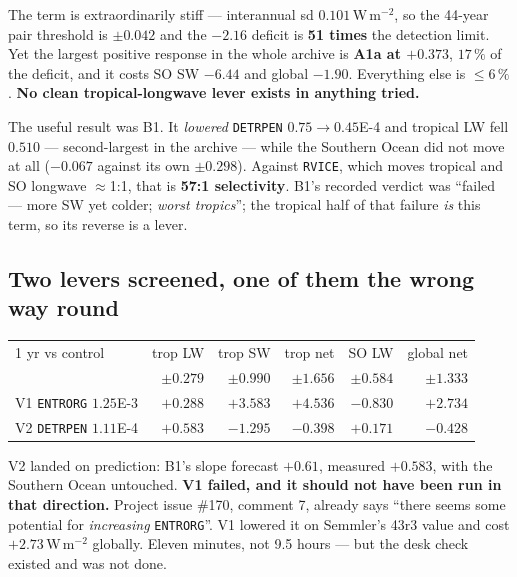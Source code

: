 \documentclass[10pt]{article}
\begin{document}
The term is extraordinarily stiff --- interannual sd $0.101$\,W\,m$^{-2}$, so the 44-year
pair threshold is $\pm0.042$ and the $-2.16$ deficit is \textbf{51 times} the detection
limit. Yet the largest positive response in the whole archive is \textbf{A1a at $+0.373$},
$17\,\%$ of the deficit, and it costs SO SW $-6.44$ and global $-1.90$. Everything else is
$\leq 6\,\%$. \textbf{No clean tropical-longwave lever exists in anything tried.}

The useful result was B1. It \emph{lowered} \texttt{DETRPEN} $0.75\to0.45$E-4 and tropical
LW fell $0.510$ --- second-largest in the archive --- while the Southern Ocean did not
move at all ($-0.067$ against its own $\pm0.298$). Against \texttt{RVICE}, which moves
tropical and SO longwave $\approx$1:1, that is \textbf{57:1 selectivity}. B1's recorded
verdict was ``failed --- more SW yet colder; \emph{worst tropics}''; the tropical half of
that failure \emph{is} this term, so its reverse is a lever.

\subsection{Two levers screened, one of them the wrong way round}\label{sub:r27v}
\begin{center}\footnotesize
\begin{tabular}{l r r r r r}
\toprule
1 yr vs control & trop LW & trop SW & trop net & SO LW & global net \\
& \tiny$\pm0.279$ & \tiny$\pm0.990$ & \tiny$\pm1.656$ & \tiny$\pm0.584$ & \tiny$\pm1.333$ \\
\midrule
V1 \texttt{ENTRORG} $1.25$E-3 & $+0.288$ & $\mathbf{+3.583}$ & $\mathbf{+4.536}$ & $\mathbf{-0.830}$ & $\mathbf{+2.734}$ \\
V2 \texttt{DETRPEN} $1.11$E-4 & $\mathbf{+0.583}$ & $\mathbf{-1.295}$ & $-0.398$ & $+0.171$ & $-0.428$ \\
\bottomrule
\end{tabular}
\end{center}

\noindent V2 landed on prediction: B1's slope forecast $+0.61$, measured $+0.583$, with the
Southern Ocean untouched. \textbf{V1 failed, and it should not have been run in that
direction.} Project issue \#170, comment 7, already says ``there seems some potential for
\emph{increasing} \texttt{ENTRORG}''. V1 lowered it on Semmler's 43r3 value and cost
$+2.73$\,W\,m$^{-2}$ globally. Eleven minutes, not 9.5 hours --- but the desk check
existed and was not done.
\end{document}
